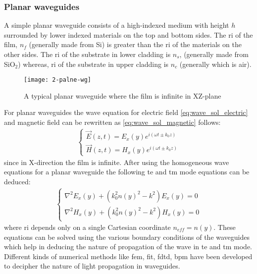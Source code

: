 \documentclass[../report.tex]{subfiles}
\begin{document}
		\subsubsection{Planar waveguides}
A simple planar waveguide consists of a high-indexed medium with height $h$	surrounded by lower indexed materials on the top and bottom sides. The \gls{ri} of the film, $n_f$ (generally made from Si) is greater than the \gls{ri} of the materials on the other sides. The \gls{ri} of the substrate in lower cladding is $n_s$, (generally made from SiO$_{2}$) whereas, \gls{ri} of the substrate in upper cladding is $n_c$ (generally which is air).
\begin{figure}[H]
	\centering
	\texttt{[image: 2-palne-wg]}
	\caption{A typical planar waveguide where the film is infinite in XZ-plane}
	\label{fig:2_palne_wg}
\end{figure}
For planar waveguides the wave equation for electric field \ref{eq:wave_sol_electric} and magnetic field can be rewritten as \ref{eq:wave_sol_magnetic} follows:
\begin{equation}\label{eq:wave_sol_planar_wg}
\begin{aligned}
\begin{cases}
\overrightarrow{E}(z,t)=E_{x}(y)e^{i\left(\omega t \pm k_{0}z\right)}\\
\overrightarrow{H}(z,t)=H_{x}(y)e^{i\left(\omega t \pm k_{0}z\right)}
\end{cases}
\end{aligned}
\end{equation}	
since in X-direction the film is infinite. After using the homogeneous wave equations for a planar waveguide the following \gls{te} and \gls{tm} mode equations can be deduced:
\begin{equation}\label{eq:homogeneous_wave_sol_planar_wg}
\begin{aligned}
\begin{cases}
\nabla^{2}E_x(y) + (k_{0}^{2}n(y)^{2}-k^{2}){E_{x}(y)} = 0\\
\nabla^{2}H_x(y) + (k_{0}^{2}n(y)^{2}-k^{2}){H_{x}(y)} = 0	
\end{cases}
\end{aligned}
\end{equation}
where \gls{ri} depends only on a single Cartesian coordinate $n_{eff} = n(y)$. These equations can be solved using the various boundary conditions of the waveguides which help in deducing the nature of propagation of the wave in \gls{te} and \gls{tm} mode. Different kinds of numerical methods like \gls{fem}, \gls{fit}, \gls{fdtd}, \gls{bpm} have been developed to decipher the nature of light propagation in waveguides.
\end{document}
